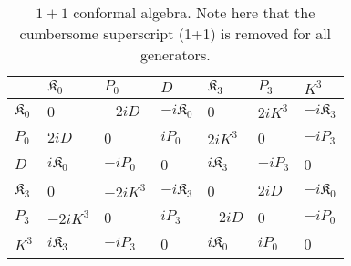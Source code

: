 \documentclass[%
 reprint,
superscriptaddress,
 amsmath,amssymb,
 aps,
]{revtex4-2}
\begin{document}
\begin{table}[h!]
\centering
\setlength{\tabcolsep}{0pt} 
\caption{\label{tabelinterpolationifd}
$1+1$ conformal algebra. Note here that the cumbersome superscript (1+1) is removed for all generators.}
\begin{tabular}{ |>{\centering\arraybackslash}p{1cm}||>{\centering\arraybackslash}p{1cm}|>{\centering\arraybackslash}p{1cm}|>{\centering\arraybackslash}p{1cm}|>{\centering\arraybackslash}p{1cm}|>{\centering\arraybackslash}p{1cm}|>{\centering\arraybackslash}p{1cm}| } 
 \hline
\rule{0pt}{16pt} & $\mathfrak{K}_{{0}}$   & $P_{{0}}$ &  $D$& $\mathfrak{K}_{{3}}$ & $P_{{3}}$& $K^{{3}}$\\
 \hline
  \hline
 \rule{0pt}{16pt}$\mathfrak{K}_{{0}}$ & \cellcolor{blue!20}0&\cellcolor{blue!20}$-2iD$&\cellcolor{blue!20}$-i\mathfrak{K}_{{0}}$&\cellcolor{red!20}0&\cellcolor{red!20}$2iK^{{3}}$&\cellcolor{red!20}${-i\mathfrak{K}_{{3}}}$\\
  \hline 
 \rule{0pt}{16pt}  $P_{{0}}$ &\cellcolor{blue!20}$2iD$&\cellcolor{blue!20}0&\cellcolor{blue!20}$iP_{{0}}$&\cellcolor{red!20}${2iK^{{3}}}$&\cellcolor{red!20}0&\cellcolor{red!20}${-iP_{{3}}}$\\
 \hline
 \rule{0pt}{16pt}$D$ &\cellcolor{blue!20}$i\mathfrak{K}_{{0}}$&\cellcolor{blue!20}$-iP_{{0}}$&\cellcolor{blue!20}0&\cellcolor{red!20}$i\mathfrak{K}_{{3}}$&\cellcolor{red!20}$-iP_{{3}}$&\cellcolor{red!20}0\\
 \hline
 \rule{0pt}{16pt}$\mathfrak{K}_{{3}}$ &\cellcolor{red!20}0&\cellcolor{red!20}$-{2iK^{{3}}}$&\cellcolor{red!20}$-i\mathfrak{K}_{{3}}$&\cellcolor{cyan!20}0&\cellcolor{cyan!20}$2iD$&\cellcolor{cyan!20}${-i\mathfrak{K}_{{0}}}$\\
 \hline 
 \rule{0pt}{16pt}$P_{{3}}$ &\cellcolor{red!20}$-2iK^{{3}}$&\cellcolor{red!20}0&\cellcolor{red!20}$iP_{{3}}$&\cellcolor{cyan!20}$-2iD$&\cellcolor{cyan!20}0&\cellcolor{cyan!20}${-iP_{{0}}}$\\
 \hline 
 \rule{0pt}{16pt}$K^{{3}}$ &\cellcolor{red!20}${i\mathfrak{K}_{{3}}}$&\cellcolor{red!20}${-iP_{{3}}}$&\cellcolor{red!20}0&\cellcolor{cyan!20}${i\mathfrak{K}_{{0}}}$&\cellcolor{cyan!20}${iP_{{0}}}$&\cellcolor{cyan!20}0\\
 \hline 
\end{tabular}
\end{table}
\end{document}
